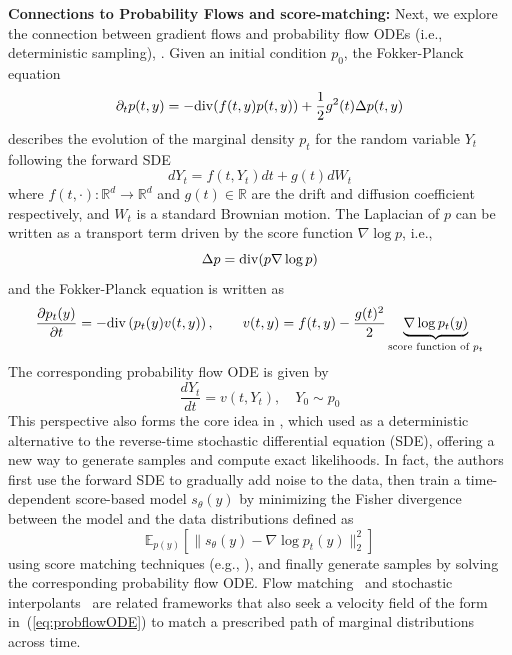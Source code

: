 \documentclass{amsart}
\newcommand{\rb}[1]{#1} %
\theoremstyle{definition}
\theoremstyle{remark}
\numberwithin{equation}{section}
\begin{document}
\textbf{Connections to Probability Flows and score-matching:} Next, we explore the connection between gradient flows and probability flow ODEs (i.e., deterministic sampling), \cite{MaoutsaReichOpper}. 
Given an initial condition $p_0$, the Fokker-Planck equation 
\[
\partial_t p(t,y) = - {\rm{div}}(f(t,y) p(t,y)) + \frac{1}{2} g^2(t) \Delta p(t,y)
\]
describes the evolution of the marginal density $p_t$ for the random variable $Y_t$ following the forward SDE 
\[
dY_t=f(t,Y_t)dt+g(t) dW_t
\]
where $f(t,\cdot):\mathbb{R}^d\to\mathbb{R}^d$ and $g(t)\in\mathbb{R}$ are the drift and diffusion coefficient respectively, and $W_t$ is a standard Brownian motion. The Laplacian of $p$ can be written as a transport term driven by the score function $\nabla\log p$, i.e., 
\[
\Delta p={\rm{div}}(p\nabla\log p)
\]
and the Fokker-Planck equation is written as  
\begin{equation*}
\frac{\partial p_t(y)}{\partial t}=-{\rm div}\left(p_t (y)v(t,y)\right),\qquad v(t,y)=f(t, y) - \frac{g(t)^2}{2}  \underbrace{\nabla \log p_t(y)}_{\textrm{score function of $p_t$}}
\end{equation*}
The corresponding probability flow ODE is given by 
\begin{equation} \label{eq:probflowODE}
\frac{d Y_t}{dt}=v(t,Y_t),\quad Y_0\sim p_0
\end{equation}
This perspective  also forms the core idea in \cite{Song2021ScoreBasedGM}, which used as a deterministic alternative to the reverse-time stochastic differential equation (SDE), offering a new way to generate samples and compute exact likelihoods.  In fact, the authors first use the forward SDE to gradually add noise to the data, then train a time-dependent score-based model $s_\theta(y)$ by minimizing the Fisher divergence between the model and the data distributions defined as
\begin{equation}\label{eq:scorematching}
\mathbb{E}_{p(y)}\left[\|s_\theta(y)-\nabla \log p_t(y)\|^2_2\right]
\end{equation}
using score matching techniques (e.g., \cite{song2020sliced}), and finally generate samples by solving the corresponding probability flow ODE. \rb{Flow matching~\cite{lipmanflow} and stochastic interpolants~\cite{albergo2023building} are related frameworks that also seek a velocity field of the form in~(\ref{eq:probflowODE}) to match a prescribed path of marginal distributions across time.}
\end{document}
